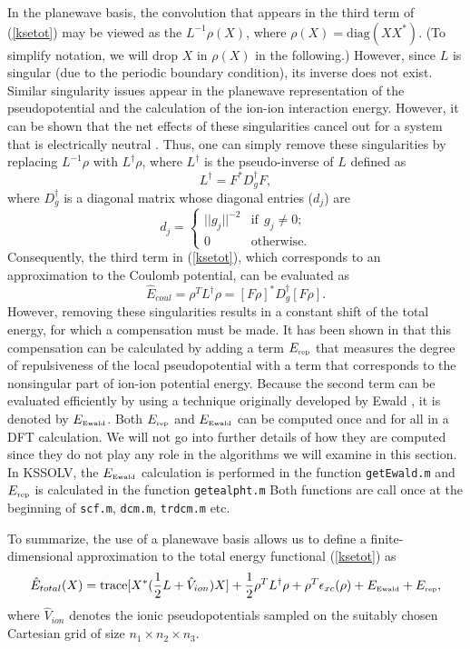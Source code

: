 \documentclass[11pt]{book}
\newcommand{\hEtot}{\hat{E}_{total}}
\begin{document}
In the planewave basis, the convolution that appears in the third term 
of (\ref{ksetot}) may be viewed as the $L^{-1}\rho(X)$, where
$\rho(X) = \mbox{diag}(XX^{\ast})$. (To simplify notation, we will drop 
$X$ in $\rho(X)$ in the following.)  However, since 
$L$ is singular (due to the periodic boundary condition), its inverse 
does not exist.  Similar singularity issues appear in the planewave 
representation of the pseudopotential and the calculation
of the ion-ion interaction energy.  However, it can be shown that the 
net effects of these singularities cancel out for a system that 
is electrically neutral \cite{Ihm,pickett}.  Thus, one can
simply remove these singularities by replacing 
$L^{-1}\rho$ with $L^{\dagger}\rho$, where $L^{\dagger}$
is the pseudo-inverse of $L$ defined as
\[
L^{\dagger} = F^{\ast} D^{\dagger}_g F,
\]
where $D^{\dagger}_g$ is a diagonal matrix whose diagonal entries ($d_j$) are
\[
d_j = \left\{
\begin{array}{cc}
||g_j||^{-2} & \mbox{if} \ \ g_j \neq 0;  \\   
0         & \mbox{otherwise}.
\end{array}
\right.
\]
Consequently, the third term in (\ref{ksetot}), which corresponds
to an approximation to the Coulomb potential, can be evaluated as 
\[
\hat{E}_{coul} = \rho^T L^{\dagger}\rho
= [F\rho]^{\ast} D^{\dagger}_g [F \rho].
\]
However, removing these singularities results 
in a constant shift of the total energy, for which a compensation must be made.  
It has been shown in \cite{Ihm} that this compensation can be
calculated by adding a term $E_{\mbox{{\tiny rep}}}$ that 
measures the degree of repulsiveness of the local pseudopotential
with a term that corresponds to the nonsingular part of ion-ion potential 
energy.  Because the second term can be evaluated efficiently by using a 
technique originally developed by Ewald \cite{ewald}, it is denoted by 
$E_{\mbox{{\tiny Ewald}}}$.  Both $E_{\mbox{{\tiny rep}}}$ and 
$E_{\mbox{{\tiny Ewald}}}$ can be computed 
once and for all in a DFT calculation.  We will not go into further details 
of how they are computed since they do not play any role in the algorithms 
we will examine in this section. In KSSOLV, the $E_{\mbox{{\tiny Ewald}}}$ 
calculation is performed in the function {\tt getEwald.m} and 
$E_{\mbox{{\tiny rep}}}$ is calculated in the function {\tt getealpht.m}
Both functions are call once at the beginning of {\tt scf.m}, {\tt dcm.m},
{\tt trdcm.m} etc.

To summarize, the use of a planewave basis allows us to define
a finite-dimensional approximation to the total energy functional 
(\ref{ksetot}) as 
\begin{equation}
\hEtot(X) = \mbox{trace}[X^{\ast}(\frac{1}{2}L + \hat{V}_{ion}) X]
+\frac{1}{2}\rho^T L^{\dagger}\rho + \rho^T \epsilon_{xc}(\rho)
+ E_{\mbox{\tiny Ewald}} + E_{\mbox{\tiny rep}},
\label{fetot}
\end{equation}
where $\hat{V}_{ion}$ denotes the ionic pseudopotentials sampled on 
the suitably chosen Cartesian grid of size $n_1 \times n_2 \times n_3$.
\end{document}
